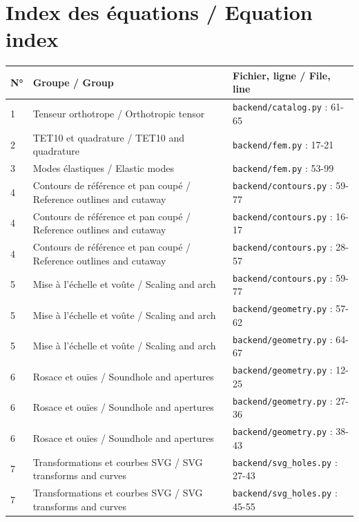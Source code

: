 \documentclass[10pt,a4paper]{article}
\begin{document}
\begin{center}\end{center}
\clearpage\section{Index des équations / Equation index}
\small\begin{longtable}{p{8mm}p{75mm}p{65mm}}\toprule N° & Groupe / Group & Fichier, ligne / File, line \\ \midrule\endhead
1 & Tenseur orthotrope / Orthotropic tensor & \texttt{backend/catalog.py} : 61-65\\[3pt]
2 & TET10 et quadrature / TET10 and quadrature & \texttt{backend/fem.py} : 17-21\\[3pt]
3 & Modes élastiques / Elastic modes & \texttt{backend/fem.py} : 53-99\\[3pt]
4 & Contours de référence et pan coupé / Reference outlines and cutaway & \texttt{backend/contours.py} : 59-77\\[3pt]
4 & Contours de référence et pan coupé / Reference outlines and cutaway & \texttt{backend/contours.py} : 16-17\\[3pt]
4 & Contours de référence et pan coupé / Reference outlines and cutaway & \texttt{backend/contours.py} : 28-57\\[3pt]
5 & Mise à l’échelle et voûte / Scaling and arch & \texttt{backend/contours.py} : 59-77\\[3pt]
5 & Mise à l’échelle et voûte / Scaling and arch & \texttt{backend/geometry.py} : 57-62\\[3pt]
5 & Mise à l’échelle et voûte / Scaling and arch & \texttt{backend/geometry.py} : 64-67\\[3pt]
6 & Rosace et ouïes / Soundhole and apertures & \texttt{backend/geometry.py} : 12-25\\[3pt]
6 & Rosace et ouïes / Soundhole and apertures & \texttt{backend/geometry.py} : 27-36\\[3pt]
6 & Rosace et ouïes / Soundhole and apertures & \texttt{backend/geometry.py} : 38-43\\[3pt]
7 & Transformations et courbes SVG / SVG transforms and curves & \texttt{backend/svg\_holes.py} : 27-43\\[3pt]
7 & Transformations et courbes SVG / SVG transforms and curves & \texttt{backend/svg\_holes.py} : 45-55\\[3pt]

\end{longtable}
\end{document}
